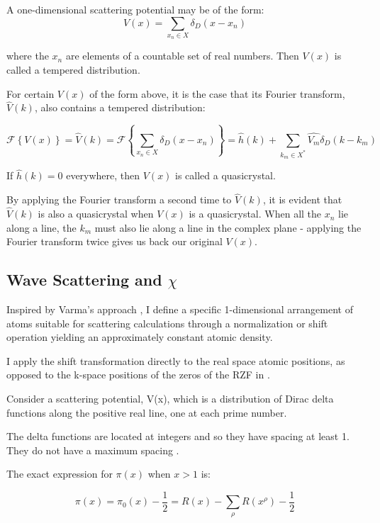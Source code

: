 \documentclass[11pt, oneside]{article}
\begin{document}
A one-dimensional scattering potential may be of the form:
\begin{equation}
V(x) = \sum_{x_n \in X}\delta_D(x - x_n)
\end{equation} 
 
where the $x_n$ are elements of a countable set of real numbers. Then $V(x)$ is called a tempered distribution.

For certain $V(x)$ of the form above, it is the case that its Fourier transform, $\hat{V}(k)$, also contains a tempered distribution:
  
\begin{equation}
 \label{eq: RiemannFourier}
 \mathcal{F}\left \{V(x)\right \} = \hat{V}(k) = \mathcal{F}\left \{ \sum_{x_n \in X}\delta_D(x - x_n) \right \} = \hat{h}(k) +  \sum_{k_m \in X^{*}} \hat{V_{m}} \delta_D(k - k_{m})
\end{equation}

If $\hat{h}(k) = 0$ everywhere, then $V(x)$ is called a quasicrystal.

By applying the Fourier transform a second time to $\hat{V}(k)$, it is evident that $\hat{V}(k)$ is also a quasicrystal when $V(x)$ is a quasicrystal. When all the $x_n$ lie along a line, the $k_m$ must also lie along a line in the complex plane - applying the Fourier transform twice gives us back our original $V(x)$.

\subsection{Wave Scattering and $\chi$}
Inspired by Varma's approach \cite{Varma2016}, I define a specific 1-dimensional arrangement of atoms suitable for scattering calculations through a normalization or shift operation yielding an approximately constant atomic density.

I apply the shift transformation directly to the real space atomic positions, as opposed to the k-space positions of the zeros of the RZF in \cite{Varma2016}.

Consider a scattering potential, V(x), which is a distribution of Dirac delta functions along the positive real line, one at each prime number.
 
The delta functions are located at integers and so they have spacing at least 1. They do not have a maximum spacing \cite{Westzynthius1931, Erdos1950}.

The exact expression \cite{Riemann1859} for $\pi(x)$ when $x>1$ is:

\begin{equation}
\pi(x) = \pi_0(x) - \frac{1}{2} = R(x) - \sum_{\rho}R(x^{\rho}) - \frac{1}{2}
\end{equation}
\end{document}
